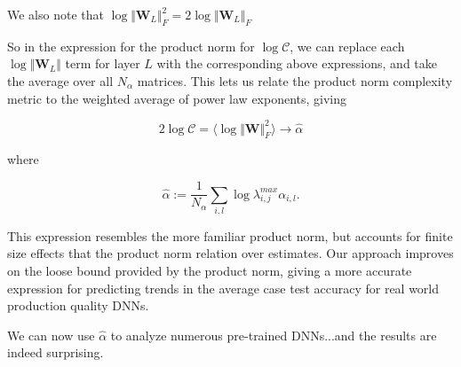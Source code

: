 We also note that $\log\Vert\mathbf{W}_{L}\Vert^{2}_{F}=2\log\Vert\mathbf{W}_{L}\Vert_{F}$ 

So in the expression for the product norm for $\log\mathcal{C}$, we can replace each $\log\Vert\mathbf{W}_{L}\Vert$ term for layer $L$ with the corresponding above expressions, and take the average over all $N_{\alpha}$  matrices.  This lets us relate the product norm complexity metric to the weighted average of power law exponents, giving

$$2\log\mathcal{C}=\langle\log\Vert\mathbf{W}\Vert^{2}_{F}\rangle\rightarrow\hat{\alpha}$$ 

where

\begin{equation}
\hat{\alpha}:=\dfrac{1}{N_{\alpha}}\sum_{i,l}\log\lambda^{max}_{i,j}\alpha_{i,l}  .
\label{eqn:alpha_hat_specific}
\end{equation}

This expression resembles the more familiar product norm, but accounts for finite size effects that the product norm relation over estimates.
Our approach improves on the loose bound provided by the product norm, giving a more accurate expression for predicting trends
in the average case test accuracy for real world production quality DNNs.

We can now use $\hat{\alpha}$ to analyze numerous pre-trained DNNs...and the results are indeed surprising.



